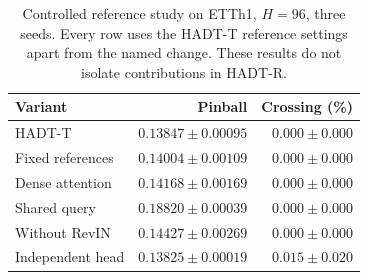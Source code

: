 \begin{table}[t]
\centering\small
\caption{Controlled reference study on ETTh1, $H=96$, three seeds. Every row uses the HADT-T reference settings apart from the named change. These results do not isolate contributions in HADT-R.}
\label{tab:ablation}
\begin{tabular}{@{}lrr@{}}
\toprule
Variant & Pinball & Crossing (\%) \\
\midrule
HADT-T & $0.13847\pm0.00095$ & $0.000\pm0.000$ \\
Fixed references & $0.14004\pm0.00109$ & $0.000\pm0.000$ \\
Dense attention & $0.14168\pm0.00169$ & $0.000\pm0.000$ \\
Shared query & $0.18820\pm0.00039$ & $0.000\pm0.000$ \\
Without RevIN & $0.14427\pm0.00269$ & $0.000\pm0.000$ \\
Independent head & $0.13825\pm0.00019$ & $0.015\pm0.020$ \\
\bottomrule
\end{tabular}
\end{table}

